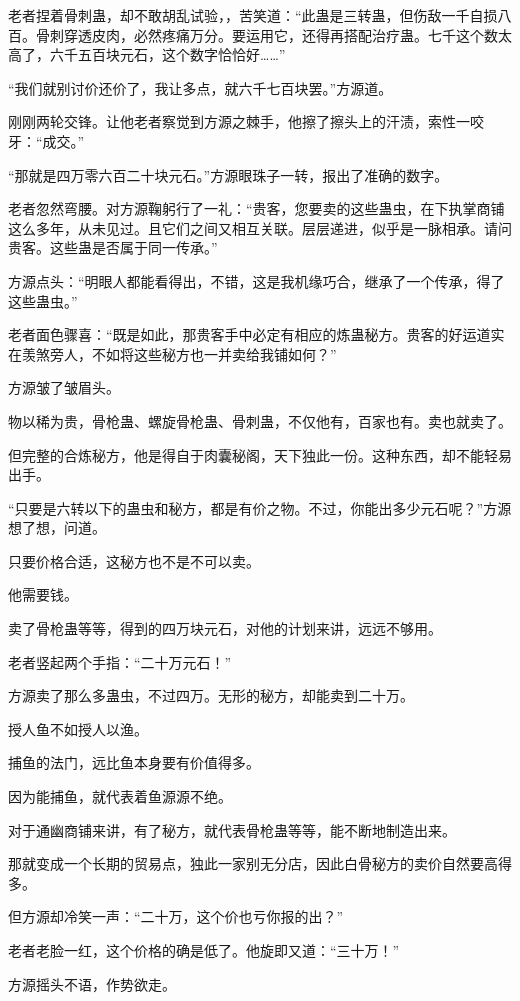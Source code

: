 \begin{this_body}
老者捏着骨刺蛊，却不敢胡乱试验，，苦笑道：“此蛊是三转蛊，但伤敌一千自损八百。骨刺穿透皮肉，必然疼痛万分。要运用它，还得再搭配治疗蛊。七千这个数太高了，六千五百块元石，这个数字恰恰好……”

“我们就别讨价还价了，我让多点，就六千七百块罢。”方源道。

刚刚两轮交锋。让他老者察觉到方源之棘手，他擦了擦头上的汗渍，索性一咬牙：“成交。”

“那就是四万零六百二十块元石。”方源眼珠子一转，报出了准确的数字。

老者忽然弯腰。对方源鞠躬行了一礼：“贵客，您要卖的这些蛊虫，在下执掌商铺这么多年，从未见过。且它们之间又相互关联。层层递进，似乎是一脉相承。请问贵客。这些蛊是否属于同一传承。”

方源点头：“明眼人都能看得出，不错，这是我机缘巧合，继承了一个传承，得了这些蛊虫。”

老者面色骤喜：“既是如此，那贵客手中必定有相应的炼蛊秘方。贵客的好运道实在羡煞旁人，不如将这些秘方也一并卖给我铺如何？”

方源皱了皱眉头。

物以稀为贵，骨枪蛊、螺旋骨枪蛊、骨刺蛊，不仅他有，百家也有。卖也就卖了。

但完整的合炼秘方，他是得自于肉囊秘阁，天下独此一份。这种东西，却不能轻易出手。

“只要是六转以下的蛊虫和秘方，都是有价之物。不过，你能出多少元石呢？”方源想了想，问道。

只要价格合适，这秘方也不是不可以卖。

他需要钱。

卖了骨枪蛊等等，得到的四万块元石，对他的计划来讲，远远不够用。

老者竖起两个手指：“二十万元石！”

方源卖了那么多蛊虫，不过四万。无形的秘方，却能卖到二十万。

授人鱼不如授人以渔。

捕鱼的法门，远比鱼本身要有价值得多。

因为能捕鱼，就代表着鱼源源不绝。

对于通幽商铺来讲，有了秘方，就代表骨枪蛊等等，能不断地制造出来。

那就变成一个长期的贸易点，独此一家别无分店，因此白骨秘方的卖价自然要高得多。

但方源却冷笑一声：“二十万，这个价也亏你报的出？”

老者老脸一红，这个价格的确是低了。他旋即又道：“三十万！”

方源摇头不语，作势欲走。


\end{this_body}
